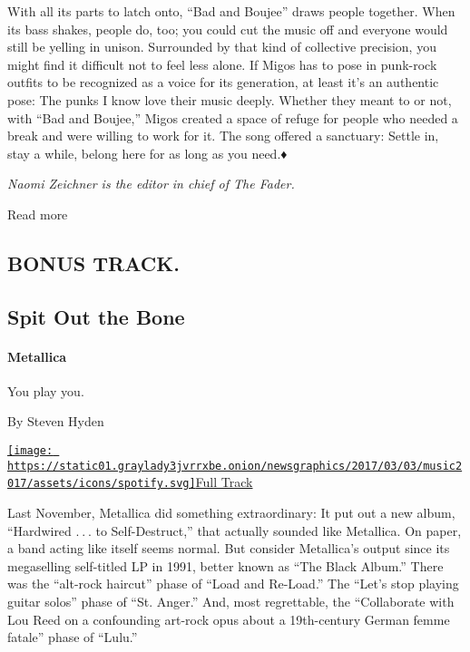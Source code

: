 With all its parts to latch onto, ``Bad and Boujee'' draws people
together. When its bass shakes, people do, too; you could cut the music
off and everyone would still be yelling in unison. Surrounded by that
kind of collective precision, you might find it difficult not to feel
less alone. If Migos has to pose in punk-rock outfits to be recognized
as a voice for its generation, at least it's an authentic pose: The
punks I know love their music deeply. Whether they meant to or not, with
``Bad and Boujee,'' Migos created a space of refuge for people who
needed a break and were willing to work for it. The song offered a
sanctuary: Settle in, stay a while, belong here for as long as you
need.♦

\emph{Naomi Zeichner is the editor in chief of The Fader.}

Read more

\hypertarget{bonus-track}{%
\subsection{BONUS TRACK.}\label{bonus-track}}

\hypertarget{--spit-out-the-bone}{%
\subsection{\texorpdfstring{ Spit Out the
Bone}{  Spit Out the Bone}}\label{--spit-out-the-bone}}

\hypertarget{metallica}{%
\paragraph{Metallica}\label{metallica}}

You play you.

By Steven Hyden

\href{https://open.spotify.com/track/7MHkweinOceprzkRWIYTTc}{\texttt{[image: https://static01.graylady3jvrrxbe.onion/newsgraphics/2017/03/03/music2017/assets/icons/spotify.svg]}Full
Track}

Last November, Metallica did something extraordinary: It put out a new
album, ``Hardwired . . . to Self-Destruct,'' that actually sounded like
Metallica. On paper, a band acting like itself seems normal. But
consider Metallica's output since its megaselling self-titled LP in
1991, better known as ``The Black Album.'' There was the ``alt-rock
haircut'' phase of ``Load and Re-Load.'' The ``Let's stop playing guitar
solos'' phase of ``St. Anger.'' And, most regrettable, the ``Collaborate
with Lou Reed on a confounding art-rock opus about a 19th-century German
femme fatale'' phase of ``Lulu.''

